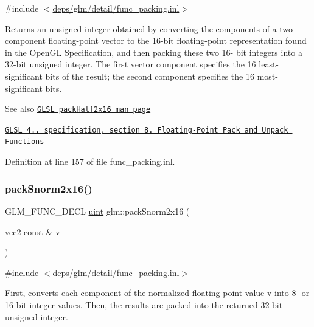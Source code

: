 {\ttfamily \#include $<$\hyperlink{func__packing_8inl}{deps/glm/detail/func\+\_\+packing.\+inl}$>$}

Returns an unsigned integer obtained by converting the components of a two-\/component floating-\/point vector to the 16-\/bit floating-\/point representation found in the Open\+GL Specification, and then packing these two 16-\/ bit integers into a 32-\/bit unsigned integer. The first vector component specifies the 16 least-\/significant bits of the result; the second component specifies the 16 most-\/significant bits.

\begin{DoxySeeAlso}{See also}
\href{http://www.opengl.org/sdk/docs/manglsl/xhtml/packHalf2x16.xml}{\tt G\+L\+SL pack\+Half2x16 man page} 

\href{http://www.opengl.org/registry/doc/GLSLangSpec.4.20.8.pdf}{\tt G\+L\+SL 4.. specification, section 8. Floating-\/\+Point Pack and Unpack Functions} 
\end{DoxySeeAlso}


Definition at line 157 of file func\+\_\+packing.\+inl.

\mbox{\label{group__core__func__packing_ga977ab172da5494e5ac63e952afacfbe2}} 
\subsubsection{\texorpdfstring{pack\+Snorm2x16()}{packSnorm2x16()}}
{\footnotesize\ttfamily G\+L\+M\+\_\+\+F\+U\+N\+C\+\_\+\+D\+E\+CL \hyperlink{group__core__precision_ga4fd29415871152bfb5abd588334147c8}{uint} glm\+::pack\+Snorm2x16 (\begin{DoxyParamCaption}\item[{\hyperlink{group__core__types_gaa1618f51db67eaa145db101d8c8431d8}{vec2} const \&}]{v }\end{DoxyParamCaption})}



{\ttfamily \#include $<$\hyperlink{func__packing_8inl}{deps/glm/detail/func\+\_\+packing.\+inl}$>$}

First, converts each component of the normalized floating-\/point value v into 8-\/ or 16-\/bit integer values. Then, the results are packed into the returned 32-\/bit unsigned integer.

